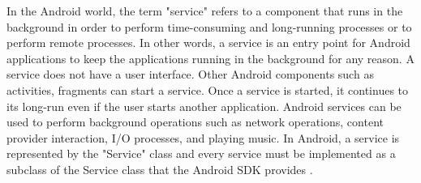 In the Android world, the term "service" refers to a component that runs in the background in order to perform time-consuming and long-running processes or to perform remote processes. In other words, a service is an entry point for Android applications to keep the applications running in the background for any reason. A service does not have a user interface. Other Android components such as activities, fragments can start a service. Once a service is started, it continues to its long-run even if the user starts another application. Android services can be used to perform background operations such as network operations, content provider interaction, I/O processes, and playing music. In Android, a service is represented by the "Service" class and every service must be implemented as a subclass of the Service class that the Android SDK provides \cite{9}.